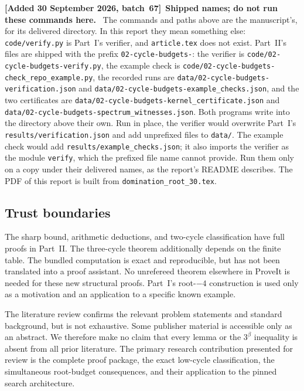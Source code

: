 \documentclass[11pt]{article}
\numberwithin{equation}{section}
\theoremstyle{definition}
\newenvironment{writenote}[1][]{\par\smallskip\begingroup\small\sloppy
 \noindent\textbf{[Added 30 September 2026, batch~67]}\if\relax\detokenize{#1}\relax\else~\textbf{#1.}\fi\ }%
 {\par\endgroup\smallskip}
\begin{document}
\begin{writenote}[Shipped names; do not run these commands here]
The commands and paths above are the manuscript's, for its delivered
directory. In this report they mean something else: \texttt{code/verify.py}
is Part~I's verifier, and \texttt{article.tex} does not exist. Part~II's
files are shipped with the prefix \nolinkurl{02-cycle-budgets-}: the verifier
is \nolinkurl{code/02-cycle-budgets-verify.py}, the example check is
\nolinkurl{code/02-cycle-budgets-check_repo_example.py}, the recorded runs
are \nolinkurl{data/02-cycle-budgets-verification.json} and
\nolinkurl{data/02-cycle-budgets-example_checks.json}, and the two
certificates are \nolinkurl{data/02-cycle-budgets-kernel_certificate.json} and
\nolinkurl{data/02-cycle-budgets-spectrum_witnesses.json}. Both programs
write into the directory above their own. Run in place, the verifier would
overwrite Part~I's \texttt{results/verification.json} and add unprefixed
files to \texttt{data/}. The example check would add
\texttt{results/example\_checks.json}; it also imports the verifier as the
module \texttt{verify}, which the prefixed file name cannot provide. Run them only on a copy under their delivered
names, as the report's README describes. The PDF of this report is built
from \texttt{domination\_root\_30.tex}.
\end{writenote}

\subsection{Trust boundaries}
The sharp bound, arithmetic deductions, and two-cycle classification have
full proofs in Part~II. The three-cycle theorem additionally depends
on the finite table. The bundled computation is exact and reproducible,
but has not been translated into a proof assistant. No unrefereed theorem
elsewhere in ProveIt is needed for these new structural proofs. Part~I's
root-$-4$ construction is used only as a motivation and an
application to a specific known example.

The literature review confirms the relevant problem statements and standard
background, but is not exhaustive. Some publisher material is accessible
only as an abstract. We therefore make no claim that every lemma or the
$3^\beta$ inequality is absent from all prior literature. The primary
research contribution presented for review is the complete proof package,
the exact low-cycle classification, the simultaneous root-budget
consequences, and their application to the pinned search architecture.
\end{document}
